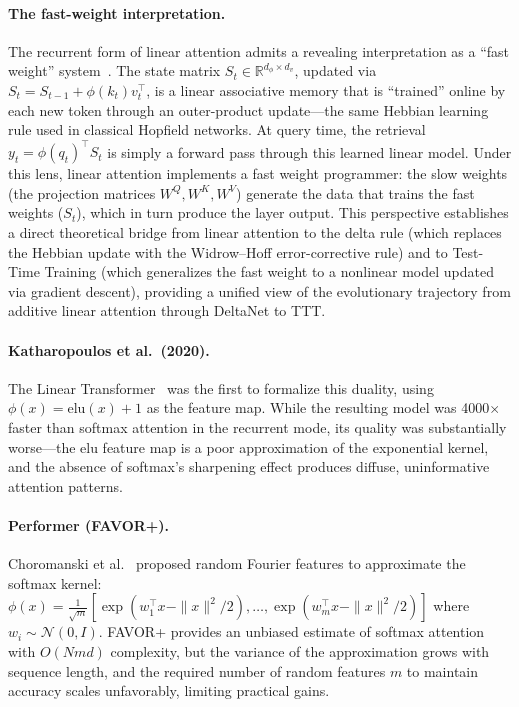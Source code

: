\paragraph{The fast-weight interpretation.}
The recurrent form of linear attention admits a revealing interpretation as a ``fast weight'' system~\cite{schmidhuber1992learning}. The state matrix $S_t \in \mathbb{R}^{d_\phi \times d_v}$, updated via $S_t = S_{t-1} + \phi(k_t) v_t^\top$, is a linear associative memory that is ``trained'' online by each new token through an outer-product update---the same Hebbian learning rule used in classical Hopfield networks. At query time, the retrieval $y_t = \phi(q_t)^\top S_t$ is simply a forward pass through this learned linear model. Under this lens, linear attention implements a fast weight programmer: the slow weights (the projection matrices $W^Q, W^K, W^V$) generate the data that trains the fast weights ($S_t$), which in turn produce the layer output. This perspective establishes a direct theoretical bridge from linear attention to the delta rule (which replaces the Hebbian update with the Widrow--Hoff error-corrective rule) and to Test-Time Training (which generalizes the fast weight to a nonlinear model updated via gradient descent), providing a unified view of the evolutionary trajectory from additive linear attention through DeltaNet to TTT.

\paragraph{Katharopoulos et al.\ (2020).}
The Linear Transformer~\cite{katharopoulos2020transformers} was the first to formalize this duality, using $\phi(x) = \text{elu}(x) + 1$ as the feature map. While the resulting model was 4000$\times$ faster than softmax attention in the recurrent mode, its quality was substantially worse---the elu feature map is a poor approximation of the exponential kernel, and the absence of softmax's sharpening effect produces diffuse, uninformative attention patterns.

\paragraph{Performer (FAVOR+).}
Choromanski et al.~\cite{choromanski2021rethinking} proposed random Fourier features to approximate the softmax kernel: $\phi(x) = \frac{1}{\sqrt{m}} [\exp(w_1^\top x - \|x\|^2/2), \ldots, \exp(w_m^\top x - \|x\|^2/2)]$ where $w_i \sim \mathcal{N}(0, I)$. FAVOR+ provides an unbiased estimate of softmax attention with $O(Nmd)$ complexity, but the variance of the approximation grows with sequence length, and the required number of random features $m$ to maintain accuracy scales unfavorably, limiting practical gains.

